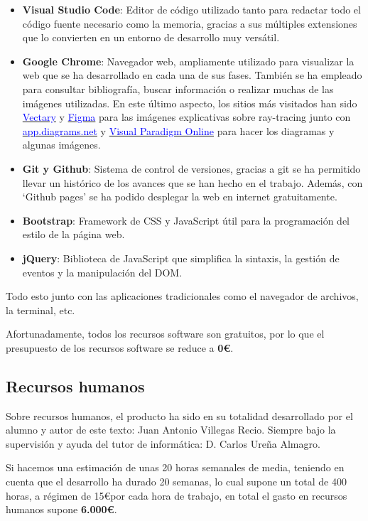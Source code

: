 \begin{itemize}
    \item \textbf{Visual Studio Code}: Editor de código utilizado tanto para redactar todo el código fuente necesario como la memoria, gracias a sus múltiples extensiones que lo convierten en un entorno de desarrollo muy versátil.
    \item \textbf{Google Chrome}: Navegador web, ampliamente utilizado para visualizar la web que se ha desarrollado en cada una de sus fases. También se ha empleado para consultar bibliografía, buscar información o realizar muchas de las imágenes utilizadas. En este último aspecto, los sitios más visitados han sido \href{https://www.vectary.com/}{\textcolor{blue}{Vectary}} y  \href{https://www.figma.com/}{\textcolor{blue}{Figma}} para las imágenes explicativas sobre ray-tracing junto con \href{https://app.diagrams.net/}{\textcolor{blue}{app.diagrams.net}} y \href{https://online.visual-paradigm.com/es/}{\textcolor{blue}{Visual Paradigm Online}} para hacer los diagramas y algunas imágenes.
    \item \textbf{Git y Github}: Sistema de control de versiones, gracias a git se ha permitido llevar un histórico de los avances que se han hecho en el trabajo. Además, con `Github pages' se ha podido desplegar la web en internet gratuitamente.
    \item \textbf{Bootstrap}: Framework de CSS y JavaScript útil para la programación del estilo de la página web.
    \item \textbf{jQuery}: Biblioteca de JavaScript que simplifica la sintaxis, la gestión de eventos y la manipulación del DOM.
\end{itemize}

Todo esto junto con las aplicaciones tradicionales como el navegador de archivos, la terminal, etc.

Afortunadamente, todos los recursos software son gratuitos, por lo que el presupuesto de los recursos software se reduce a \textbf{0\euro}.

\subsection{Recursos humanos}

Sobre recursos humanos, el producto ha sido en su totalidad desarrollado por el alumno y autor de este texto: Juan Antonio Villegas Recio. Siempre bajo la supervisión y ayuda del tutor de informática: D. Carlos Ureña Almagro.

Si hacemos una estimación de unas 20 horas semanales de media, teniendo en cuenta que el desarrollo ha durado 20 semanas, lo cual supone un total de 400 horas, a régimen de 15\euro por cada hora de trabajo, en total el gasto en recursos humanos supone \textbf{6.000\euro}.

